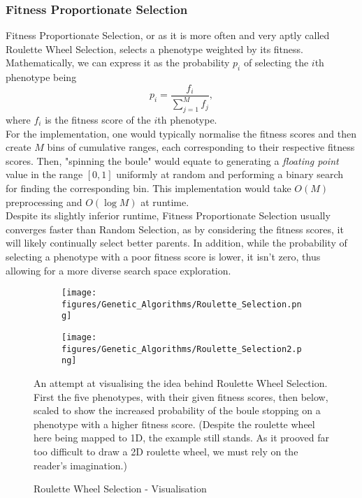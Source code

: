 \subsubsection{Fitness Proportionate Selection}
Fitness Proportionate Selection, or as it is more often and very aptly called Roulette Wheel Selection, selects a phenotype weighted by its fitness. Mathematically, we can express it as the probability $p_i$ of selecting the $i$th phenotype being
\begin{equation*}
    p_i = \frac{f_i}{\sum_{j = 1}^M f_j},
\end{equation*}
where $f_i$ is the fitness score of the $i$th phenotype.
\\
For the implementation, one would typically normalise the fitness scores and then create $M$ bins of cumulative ranges, each corresponding to their respective fitness scores. Then, "spinning the boule" would equate to generating a \textit{floating point} value in the range $[0,1]$ uniformly at random and performing a binary search for finding the corresponding bin. This implementation would take $O(M)$ preprocessing and $O(\log M )$ at runtime. 
\\
Despite its slightly inferior runtime, Fitness Proportionate Selection usually converges faster than Random Selection, as by considering the fitness scores, it will likely continually select better parents. In addition, while the probability of selecting a phenotype with a poor fitness score is lower, it isn't zero, thus allowing for a more diverse search space exploration.   

\begin{figure}[H]
    \centering
    \begin{subfigure}[b]{0.8\textwidth}
        \centering
        \texttt{[image: figures/Genetic\_Algorithms/Roulette\_Selection.png]}
    \end{subfigure}
    \begin{subfigure}[b]{0.8\textwidth}
        \centering
        \texttt{[image: figures/Genetic\_Algorithms/Roulette\_Selection2.png]}
    \end{subfigure}
    
    \caption{Roulette Wheel Selection - Visualisation}
    \small
    \raggedright
    An attempt at visualising the idea behind Roulette Wheel Selection. First the five phenotypes, with their given fitness scores, then below, scaled to show the increased probability of the boule stopping on a phenotype with a higher fitness score. (Despite the roulette wheel here being mapped to 1D, the example still stands. As it prooved far too difficult to draw a 2D roulette wheel, we must rely on the reader's imagination.)
    \label{fig:GA_Roulette_Selection}
\end{figure}

